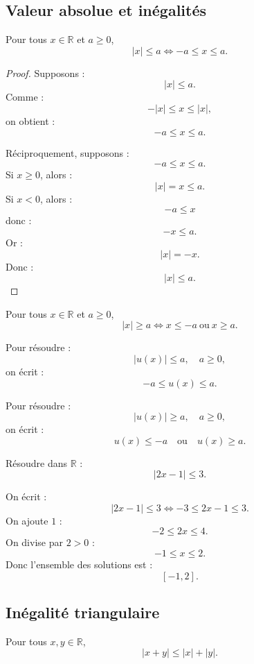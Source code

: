 \documentclass[11pt,a4paper]{article}
\newcommand{\R}{\mathbb R}
\newcommand{\abs}[1]{\left|#1\right|}
\newcommand{\ssi}{\Longleftrightarrow}
\begin{document}
\subsection{Valeur absolue et inégalités}

\begin{theorembox}
Pour tous \(x\in\R\) et \(a\geq0\),
\[
\abs{x}\leq a \ssi -a\leq x\leq a.
\]
\end{theorembox}

\begin{proof}
Supposons :
\[
\abs{x}\leq a.
\]
Comme :
\[
-\abs{x}\leq x\leq \abs{x},
\]
on obtient :
\[
-a\leq x\leq a.
\]

Réciproquement, supposons :
\[
-a\leq x\leq a.
\]
Si \(x\geq0\), alors :
\[
\abs{x}=x\leq a.
\]
Si \(x<0\), alors :
\[
-a\leq x
\]
donc :
\[
-x\leq a.
\]
Or :
\[
\abs{x}=-x.
\]
Donc :
\[
\abs{x}\leq a.
\]
\end{proof}

\begin{theorembox}
Pour tous \(x\in\R\) et \(a\geq0\),
\[
\abs{x}\geq a \ssi x\leq -a\ \text{ou}\ x\geq a.
\]
\end{theorembox}

\begin{methodbox}
Pour résoudre :
\[
\abs{u(x)}\leq a,
\quad a\geq0,
\]
on écrit :
\[
-a\leq u(x)\leq a.
\]

Pour résoudre :
\[
\abs{u(x)}\geq a,
\quad a\geq0,
\]
on écrit :
\[
u(x)\leq -a
\quad\text{ou}\quad
u(x)\geq a.
\]
\end{methodbox}

\begin{exercicebox}
Résoudre dans \(\R\) :
\[
\abs{2x-1}\leq 3.
\]
\end{exercicebox}

\begin{correctionbox}
On écrit :
\[
\abs{2x-1}\leq3
\ssi
-3\leq2x-1\leq3.
\]
On ajoute \(1\) :
\[
-2\leq2x\leq4.
\]
On divise par \(2>0\) :
\[
-1\leq x\leq2.
\]
Donc l'ensemble des solutions est :
\[
[-1,2].
\]
\end{correctionbox}

\subsection{Inégalité triangulaire}

\begin{theorembox}
Pour tous \(x,y\in\R\),
\[
\abs{x+y}\leq\abs{x}+\abs{y}.
\]
\end{theorembox}
\end{document}
